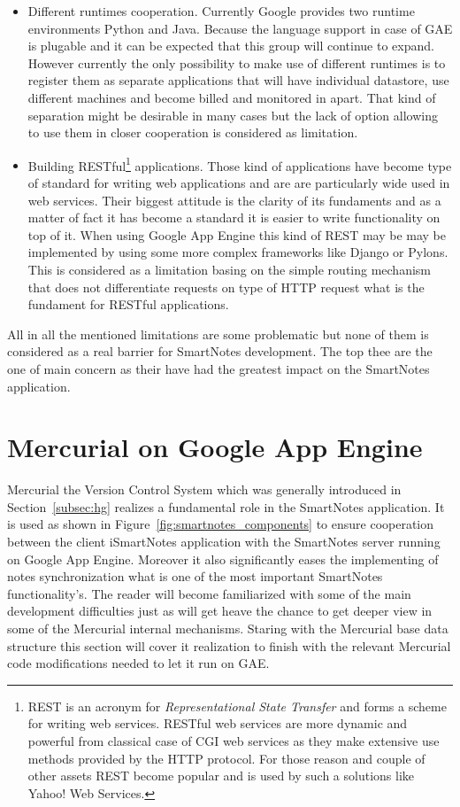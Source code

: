 \begin{itemize}
\item{Different runtimes cooperation. Currently Google provides two runtime environments Python and Java. Because the language support in case of GAE is plugable and it can be expected that this group will continue to expand. However currently the only possibility to make use of different runtimes is to register them as separate applications that will have individual datastore, use different machines and become billed and monitored in apart. That kind of separation might be desirable in many cases but the lack of option allowing to use them in closer cooperation is considered as limitation.}

\item{Building RESTful\footnote{REST is an acronym for \textit{Representational State Transfer} and forms a scheme for writing web services. RESTful web services are more dynamic and powerful from classical case of CGI web services as they make extensive use  methods provided by the HTTP protocol. For those reason and couple of other assets REST become popular and is used by such a solutions like Yahoo! Web Services.} applications. Those kind of applications have become type of standard for writing web applications and are are particularly wide used in web services. Their biggest attitude is the clarity of its fundaments and as a matter of fact it has become a standard it is easier to write functionality on top of it. When using Google App Engine this kind of REST may be may be implemented by using some more complex frameworks like Django or Pylons. This is considered as a limitation basing on the simple routing mechanism that does not differentiate requests on type of HTTP request what is the fundament for RESTful applications.}
\end{itemize}
All in all the mentioned limitations are some problematic but none of them is considered as a real barrier for SmartNotes development. The top thee are the one of main concern as their have had the greatest impact on the SmartNotes application. 

\section{Mercurial on Google App Engine}\label{sec:hg_on_gae}
Mercurial the Version Control System which was generally introduced in Section~\ref{subsec:hg} realizes a fundamental role in the SmartNotes application. It is used as shown in Figure~\ref{fig:smartnotes_components} to ensure cooperation between the client iSmartNotes application with the SmartNotes server running on Google App Engine. Moreover it also significantly eases the implementing of notes synchronization what is one of the most important SmartNotes functionality's. The reader will become familiarized with some of the main development difficulties just as will get heave the chance to get deeper view in some of the Mercurial internal mechanisms. Staring with the Mercurial base data structure this section will cover it realization to finish with the relevant Mercurial code modifications needed to let it run on GAE.

